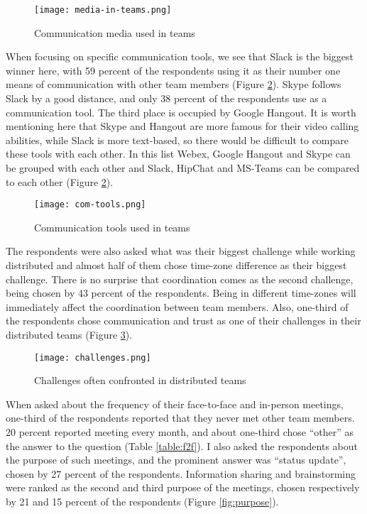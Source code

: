 \begin{figure}[hbt!]
\centering
\texttt{[image: media-in-teams.png]}
\caption{Communication media used in teams}\label{fig:com-media}
\end{figure}



When focusing on specific communication tools, we see that Slack is the biggest winner here, with 59 percent of the respondents using it as their number one means of communication with other team members (Figure \ref{fig:com-tools}). Skype follows Slack by a good distance, and only 38 percent of the respondents use as a communication tool. The third place is occupied by Google Hangout. It is worth mentioning here that Skype and Hangout are more famous for their video calling abilities, while Slack is more text-based, so there would be difficult to compare these tools with each other. In this list Webex, Google Hangout and Skype can be grouped with each other and Slack, HipChat and MS-Teams can be compared to each other (Figure \ref{fig:com-tools}).


\begin{figure}[hbt!]
\centering
\texttt{[image: com-tools.png]}
\caption{Communication tools used in teams}\label{fig:com-tools}
\end{figure}

The respondents were also asked what was their biggest challenge while working distributed and almost half of them chose time-zone difference as their biggest challenge. There is no surprise that coordination comes as the second challenge, being chosen by 43 percent of the respondents. Being in different time-zones will immediately affect the coordination between team members. Also, one-third of the respondents chose communication and trust as one of their challenges in their distributed teams (Figure \ref{fig:challenges}).

\begin{figure}[hbt!]
\centering
\texttt{[image: challenges.png]}
\caption{Challenges often confronted in distributed teams}\label{fig:challenges}
\end{figure}

When asked about the frequency of their face-to-face and in-person meetings, one-third of the respondents reported that they never met other team members. 20 percent reported meeting every month, and about one-third chose “other” as the answer to the question (Table \ref{table:f2f}). I also asked the respondents about the purpose of such meetings, and the prominent answer was “status update”, chosen by 27 percent of the respondents. Information sharing and brainstorming were ranked as the second and third purpose of the meetings, chosen respectively by 21 and 15 percent of the respondents (Figure \ref{fig:purpose}). 

